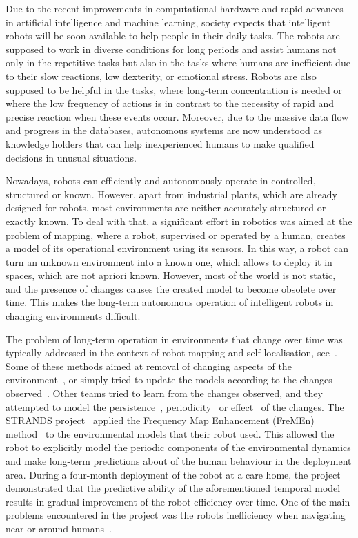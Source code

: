 Due to the recent improvements in computational hardware and rapid advances in artificial intelligence and machine learning, society expects that intelligent robots will be soon available to help people in their daily tasks. 
The robots are supposed to work in diverse conditions for long periods and assist humans not only in the repetitive tasks but also in the tasks where humans are inefficient due to their slow reactions, low dexterity, or emotional stress.
Robots are also supposed to be helpful in the tasks, where long-term concentration is needed or where the low frequency of actions is in contrast to the necessity of rapid and precise reaction when these events occur.
Moreover, due to the massive data flow and progress in the databases, autonomous systems are now understood as knowledge holders that can help inexperienced humans to make qualified decisions in unusual situations.

Nowadays, robots can efficiently and autonomously operate in controlled, structured or known.
However, apart from industrial plants, which are already designed for robots, most environments are neither accurately structured or exactly known.
To deal with that, a significant effort in robotics was aimed at the problem of mapping, where a robot, supervised or operated by a human, creates a model of its operational environment using its sensors.
In this way, a robot can turn an unknown environment into a known one, which allows to deploy it in spaces, which are not apriori known.
However, most of the world is not static, and the presence of changes causes the created model to become obsolete over time.
This makes the long-term autonomous operation of intelligent robots in changing environments difficult.

The problem of long-term operation in environments that change over time was typically addressed in the context of robot mapping and self-localisation, see~\cite{cadena2016past,kunze2018artificial}.
Some of these methods aimed at removal of changing aspects of the environment~\cite{lowry2016supervised}, or simply tried to update the models according to the changes observed~\cite{biber2009experimental,churchill2013experience}.
Other teams tried to learn from the changes observed, and they attempted to model the persistence~\cite{tipaldi2013lifelong,rosen2016towards}, periodicity~\cite{krajnik2017fremen} or effect~\cite{neubert2015superpixel} of the changes.
The STRANDS project~\cite{hawes2017strands} applied the Frequency Map Enhancement (FreMEn) method~\cite{krajnik2017fremen} to the environmental models that their robot used. 
This allowed the robot to explicitly model the periodic components of the environmental dynamics and make long-term predictions about of the human behaviour in the deployment area.
During a four-month deployment of the robot at a care home, the project demonstrated that the predictive ability of the aforementioned temporal model results in gradual improvement of the robot efficiency over time. 
One of the main problems encountered in the project was the robots inefficiency when navigating near or around humans~\cite{hebesberger2017patterns}.

